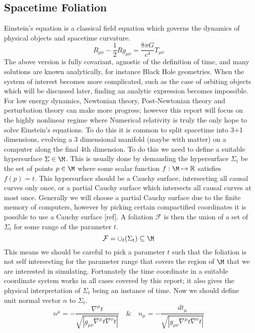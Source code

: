 \subsection{Spacetime Foliation}
Einstein's equation is a classical field equation which governs the dynamics of physical objects and spacetime curvature. 
\begin{equation}R_{\mu\nu} - \frac{1}{2} Rg_{\mu\nu} = \frac{8\pi G}{c^4}T_{\mu\nu}\end{equation}
The above version is fully covariant, agnostic of the definition of time, and many solutions are known analytically, for instance Black Hole geometries. When the system of interest becomes more complicated, such as the case of orbiting objects which will be discussed later, finding an analytic expression becomes impossible. For low energy dynamics, Newtonian theory, Post-Newtonian theory and perturbation theory can make more progress; however this report will focus on the highly nonlinear regime where Numerical relativity is truly the only hope to solve Einstein's equations. To do this it is common to split spacetime into 3+1 dimensions, evolving a 3 dimensional manifold (maybe with matter) on a computer along the final 4th dimension. To do this we need to define a suitable hypersurface $\Sigma \in \M$. This is usually done by demanding the hypersurface $\Sigma_t$ be the set of points $p \in \M$ where some scalar function $f:\M\mapsto \mathbb{R}$ satisfies $f(p)=t$. This hypersurface should be a Cauchy surface, intersecting all causal curves only once, or a partial Cauchy surface which intersects all causal curves at most once. Generally we will choose a partial Cauchy surface due to the finite memory of computers, however by picking certain compactified coordinates it is possible to use a Cauchy surface [ref]. A foliation $\mathcal{F}$ is then the union of a set of $\Sigma_t$ for some range of the parameter $t$.
\[\mathcal{F} = \cup_t(\Sigma_t) \subseteq \M\]
This means we should be careful to pick a parameter $t$ such that the foliation is not self intersecting for the parameter range that covers the region of $\M$ that we are interested in simulating. Fortunately the time coordinate in a suitable coordinate system works in all cases covered by this report; it also gives the physical interpretation of $\Sigma_t$ being an instance of time. Now we should define unit normal vector $n$ to $\Sigma_t$.
\begin{equation} n^\mu = -\frac{\nabla^\mu t}{\sqrt{|g_{\mu\nu}\nabla^\mu t \nabla^\nu t|}} \quad \& \quad  n_\mu = -\frac{dt_\mu}{\sqrt{|g_{\mu\nu}\nabla^\mu t \nabla^\nu t|}}\end{equation}
